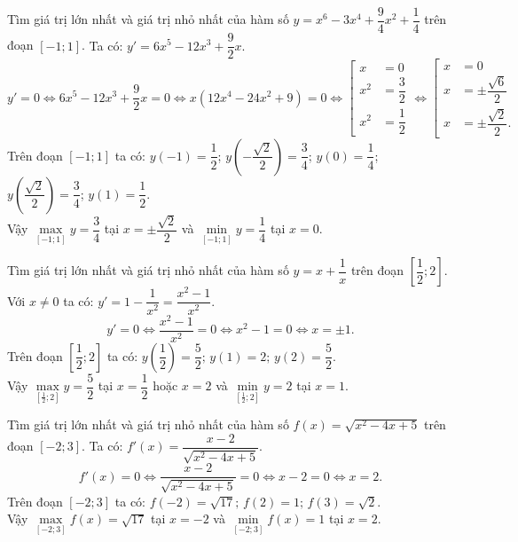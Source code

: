 \begin{vd}%
	Tìm giá trị lớn nhất và giá trị nhỏ nhất của hàm số $y = x^6 - 3x^4 + \dfrac{9}{4}x^2 + \dfrac{1}{4}$ trên đoạn $[-1;1]$.
	\loigiai
	{
		Ta có: $y' = 6x^5 - 12x^3 + \dfrac{9}{2}x$.
		$$y' = 0 \Leftrightarrow 6x^5 - 12x^3 + \dfrac{9}{2}x = 0 \Leftrightarrow x(12x^4 - 24x^2 + 9) = 0 \Leftrightarrow \left[ \begin{array}{ll} x & = 0 \\ x^2 & = \dfrac{3}{2} \\ x^2 & = \dfrac{1}{2} \end{array}   \right. \Leftrightarrow \left[ \begin{array}{ll} x & = 0 \\ x & = \pm \dfrac{\sqrt{6}}{2} \\ x & = \pm \dfrac{\sqrt{2}}{2}. \end{array}   \right.$$
		Trên đoạn $[-1;1]$ ta có: $y(-1) = \dfrac{1}{2}$; $y \left(-\dfrac{\sqrt{2}}{2} \right) = \dfrac{3}{4}$; $ y(0) = \dfrac{1}{4}$; $y \left(\dfrac{\sqrt{2}}{2} \right) = \dfrac{3}{4}$; $y(1) = \dfrac{1}{2}$.\\
		Vậy $\max\limits_{[-1;1]} y = \dfrac{3}{4}$ tại $x = \pm \dfrac{\sqrt{2}}{2}$ và $\min\limits_{[-1;1]} y = \dfrac{1}{4}$ tại $x = 0$.
	}
\end{vd}


\begin{vd}%
	Tìm giá trị lớn nhất và giá trị nhỏ nhất của hàm số $y = x + \dfrac{1}{x}$ trên đoạn $\left[ \dfrac{1}{2};2 \right]$.
	\loigiai
	{
		Với $x \neq 0$ ta có: $y' = 1 - \dfrac{1}{x^2} = \dfrac{x^2 - 1}{x^2}$.
		$$y' = 0 \Leftrightarrow \dfrac{x^2 - 1}{x^2} = 0 \Leftrightarrow x^2 - 1 = 0 \Leftrightarrow x = \pm 1.$$
		Trên đoạn $\left[ \dfrac{1}{2};2 \right]$ ta có: $y\left( \dfrac{1}{2} \right) = \dfrac{5}{2}; \, y(1) = 2; \, y(2) = \dfrac{5}{2}$.\\
		Vậy $\max\limits_{\left[ \frac{1}{2};2 \right]} y = \dfrac{5}{2}$ tại $x = \dfrac{1}{2}$ hoặc $x = 2$ và $\min\limits_{\left[ \frac{1}{2};2 \right]} y = 2$ tại $x = 1$.
	}
\end{vd}


\begin{vd}%
	Tìm giá trị lớn nhất và giá trị nhỏ nhất của hàm số $f(x) = \sqrt{x^2 - 4x + 5}$ trên đoạn $[-2;3]$.
	\loigiai
	{
		Ta có: $f'(x) = \dfrac{x-2}{\sqrt{x^2 - 4x + 5}}$.
		$$f'(x) = 0 \Leftrightarrow \dfrac{x-2}{\sqrt{x^2 - 4x + 5}} = 0 \Leftrightarrow x - 2 = 0 \Leftrightarrow x = 2.$$
		Trên đoạn $[-2;3]$ ta có: $f(-2) = \sqrt{17}; \, f(2) = 1; \, f(3) = \sqrt{2}$.\\
		Vậy $\max\limits_{[-2;3]} f(x) = \sqrt{17}$ tại $x = -2$ và $\min\limits_{[-2;3]} f(x) = 1$ tại $x = 2$.
	}
\end{vd}


